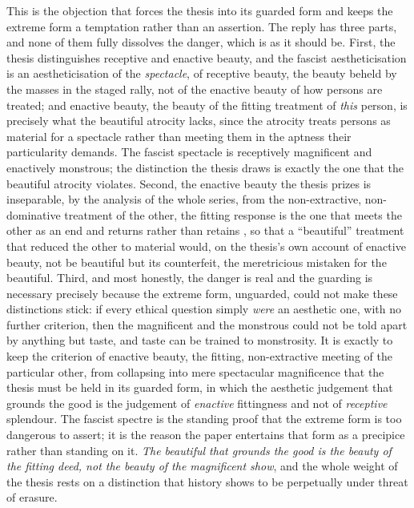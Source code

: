 This is the objection that forces the thesis into its guarded form and keeps the extreme form a temptation rather than an assertion. The reply has three parts, and none of them fully dissolves the danger, which is as it should be. First, the thesis distinguishes receptive and enactive beauty, and the fascist aestheticisation is an aestheticisation of the \emph{spectacle}, of receptive beauty, the beauty beheld by the masses in the staged rally, not of the enactive beauty of how persons are treated; and enactive beauty, the beauty of the fitting treatment of \emph{this} person, is precisely what the beautiful atrocity lacks, since the atrocity treats persons as material for a spectacle rather than meeting them in the aptness their particularity demands. The fascist spectacle is receptively magnificent and enactively monstrous; the distinction the thesis draws is exactly the one that the beautiful atrocity violates. Second, the enactive beauty the thesis prizes is inseparable, by the analysis of the whole series, from the non-extractive, non-dominative treatment of the other, the fitting response is the one that meets the other as an end and returns rather than retains \parencite{paperxx,paperxvii}, so that a ``beautiful'' treatment that reduced the other to material would, on the thesis's own account of enactive beauty, not be beautiful but its counterfeit, the meretricious mistaken for the beautiful. Third, and most honestly, the danger is real and the guarding is necessary precisely because the extreme form, unguarded, could not make these distinctions stick: if every ethical question simply \emph{were} an aesthetic one, with no further criterion, then the magnificent and the monstrous could not be told apart by anything but taste, and taste can be trained to monstrosity. It is exactly to keep the criterion of enactive beauty, the fitting, non-extractive meeting of the particular other, from collapsing into mere spectacular magnificence that the thesis must be held in its guarded form, in which the aesthetic judgement that grounds the good is the judgement of \emph{enactive} fittingness and not of \emph{receptive} splendour. The fascist spectre is the standing proof that the extreme form is too dangerous to assert; it is the reason the paper entertains that form as a precipice rather than standing on it. \emph{The beautiful that grounds the good is the beauty of the fitting deed, not the beauty of the magnificent show}, and the whole weight of the thesis rests on a distinction that history shows to be perpetually under threat of erasure.

